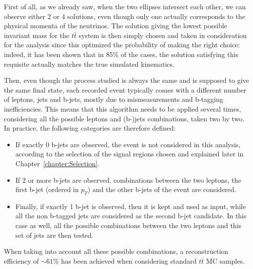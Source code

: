 \documentclass[a4paper, 10pt, openright]{report}
\begin{document}
First of all, as we already saw, when the two ellipses intersect each other, we can observe either 2 or 4 solutions, even though only one actually corresponds to the physical momenta of the neutrinos. The solution giving the lowest possible invariant mass for the $t \bar t$ system is then simply chosen and taken in consideration for the analysis since this optimized the probability of making the right choice: indeed, it has been shown \cite{rightChoice} that in 85\% of the cases, the solution satisfying this requisite actually matches the true simulated kinematics.

Then, even though the process studied is always the same and is supposed to give the same final state, each recorded event typically comes with a different number of leptons, jets and b-jets, mostly due to mismeasurements and b-tagging inefficiencies. This means that this algorithm needs to be applied several times, considering all the possible leptons and (b-)jets combinations, taken two by two. In practice, the following categories are therefore defined: 
\begin{itemize}
\item If exactly 0 b-jets are observed, the event is not considered in this analysis, according to the selection of the signal regions chosen and explained later in Chapter~\ref{chapter:Selection}.
\item If 2 or more b-jets are observed, combinations between the two leptons, the first b-jet (ordered in $p_T$) and the other b-jets of the event are considered.
\item Finally, if exactly 1 b-jet is observed, then it is kept and used as input, while all the non b-tagged jets are considered as the second b-jet candidate. In this case as well, all the possible combinations between the two leptons and this set of jets are then tested.
\end{itemize}

When taking into account all these possible combinations, a reconstruction efficiency of $\sim 61$\% has been achieved when considering standard $t \bar t$ \ac{MC} samples. 
\end{document}
